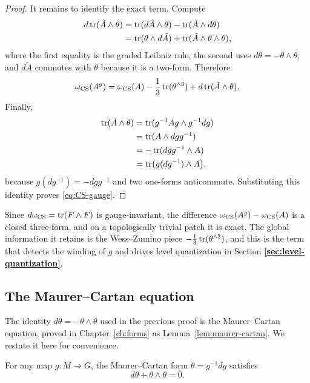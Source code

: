 \begin{proof}
\medskip

\noindent It remains to identify the exact term. Compute
\begin{align*}
d\operatorname{tr}(\tilde A\wedge\theta)
&= \operatorname{tr}(d\tilde A\wedge\theta) - \operatorname{tr}(\tilde A\wedge d\theta) \\
&= \operatorname{tr}(\theta\wedge d\tilde A) + \operatorname{tr}(\tilde A\wedge\theta\wedge\theta),
\end{align*}
where the first equality is the graded Leibniz rule, the second uses $d\theta=-\theta\wedge\theta$, and $d\tilde A$ commutes with $\theta$ because it is a two-form. Therefore
\begin{equation*}
\omega_{\operatorname{CS}}(A^g)
= \omega_{\operatorname{CS}}(A)
 - \frac{1}{3}\operatorname{tr}(\theta^{\wedge 3})
 + d\operatorname{tr}(\tilde A\wedge\theta).
\end{equation*}
Finally,
\begin{align*}
\operatorname{tr}(\tilde A\wedge\theta)
&= \operatorname{tr}(g^{-1}Ag\wedge g^{-1}dg) \\
&= \operatorname{tr}(A\wedge dgg^{-1}) \\
&= -\operatorname{tr}(dgg^{-1}\wedge A) \\
&= \operatorname{tr}\bigl(g(dg^{-1})\wedge A\bigr),
\end{align*}
because $g(dg^{-1})=-dgg^{-1}$ and two one-forms anticommute. Substituting this identity proves \eqref{eq:CS-gauge}.
\end{proof}

\begin{remark}
Since $d\omega_{\operatorname{CS}} = \operatorname{tr}(F\wedge F)$ is gauge-invariant, the difference $\omega_{\operatorname{CS}}(A^g) - \omega_{\operatorname{CS}}(A)$ is a closed three-form, and on a topologically trivial patch it is exact. The global information it retains is the Wess--Zumino piece $-\tfrac{1}{3}\operatorname{tr}(\theta^{\wedge 3})$, and this is the term that detects the winding of $g$ and drives level quantization in Section \textbf{\ref{sec:level-quantization}}.
\end{remark}

\subsection{The Maurer--Cartan equation}

The identity $d\theta = -\theta\wedge\theta$ used in the previous proof is the Maurer--Cartan equation, proved in Chapter~\ref{ch:forms} as Lemma~\ref{lem:maurer-cartan}. We restate it here for convenience.

\begin{lemma}\label{lem:MC}
For any map $g:M\to G$, the Maurer--Cartan form $\theta = g^{-1}dg$ satisfies
\begin{equation}\label{eq:MC}
d\theta + \theta\wedge\theta = 0.
\end{equation}
\end{lemma}

